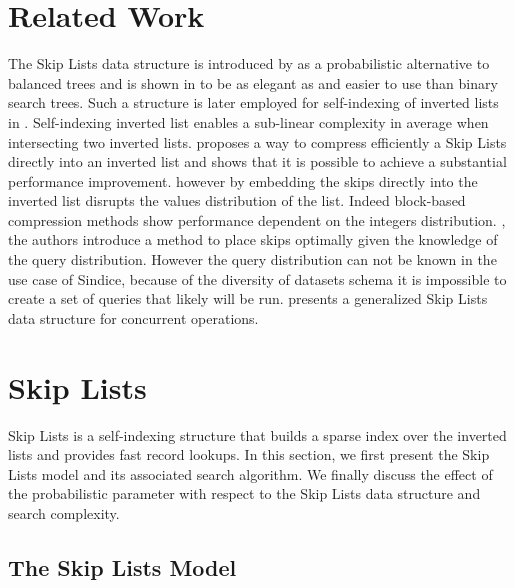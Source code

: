 \section{Related Work}

The Skip Lists data structure is introduced by \cite{pugh:90} as a
probabilistic alternative to balanced trees and is shown in
\cite{zachary:BST:2007} to be as elegant as and easier to use than binary search
trees. Such a structure is later employed for self-indexing of inverted lists
in \cite{moffat:96}. Self-indexing inverted list enables a sub-linear
complexity in average when intersecting two inverted lists. \cite{boldi:05}
proposes a way to compress efficiently a Skip Lists directly into an inverted
list and shows that it is possible to achieve a substantial performance
improvement. however by embedding the skips directly into the inverted list
disrupts the values distribution of the list. Indeed block-based compression
methods show performance dependent on the integers distribution.
\cite{chierichetti:08}, the authors introduce a method to place skips
optimally given the knowledge of the query distribution. However the query
distribution can not be known in the use case of Sindice, because of the
diversity of datasets schema it is impossible to create a set of queries that
likely will be run. \cite{messeguer:skiptrees:1997} presents a generalized
Skip Lists data structure for concurrent operations.

\section{Skip Lists}
\label{sec:skiplists}

Skip Lists is a self-indexing structure that builds a sparse index over the
inverted lists and provides fast record lookups. In this section, we first
present the Skip Lists model and its associated search algorithm. We finally
discuss the effect of the probabilistic parameter with respect to the Skip
Lists data structure and search complexity.

\subsection{The Skip Lists Model}

